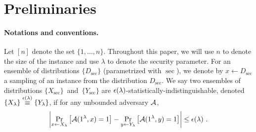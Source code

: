 
\newcommand{\memsize}{{N}}
\newcommand{\blocksize}{{b}}
\newcommand{\Y}{{\bf Y}}

%
\section{Preliminaries}
\label{sec:defs}

\paragraph{Notations and conventions.}
Let $[n]$ denote the set $\{1,\ldots,n\}$. Throughout this paper, we will use
$n$ to denote the size of the instance and use $\lambda$ to denote the security parameter. 
For an ensemble of distributions $\{D_\sec\}$ (parametrized with $\sec$),
we denote by $x \leftarrow D_\sec$ a sampling of an instance from the distribution $D_\sec$. 
We say two ensembles of distributions $\{X_\sec\}$~and~$\{Y_\sec\}$ 
are ${\epsilon}({\lambda})$-statistically-indistinguishable, denoted $\{X_{\lambda}\} \overset{{\epsilon}({\lambda})}{\equiv} \{Y_{\lambda}\}$, 
if for any unbounded adversary ${\cal A}$, 
\[
\left|\Pr_{x\leftarrow X_{\lambda}}\left[{\cal A}(1^\lambda, x)=1\right] - \Pr_{y\leftarrow Y_{\lambda}}\left[{\cal A}(1^\lambda, y)=1\right] \right| \leq {\epsilon}({\lambda}) \ .
\]



